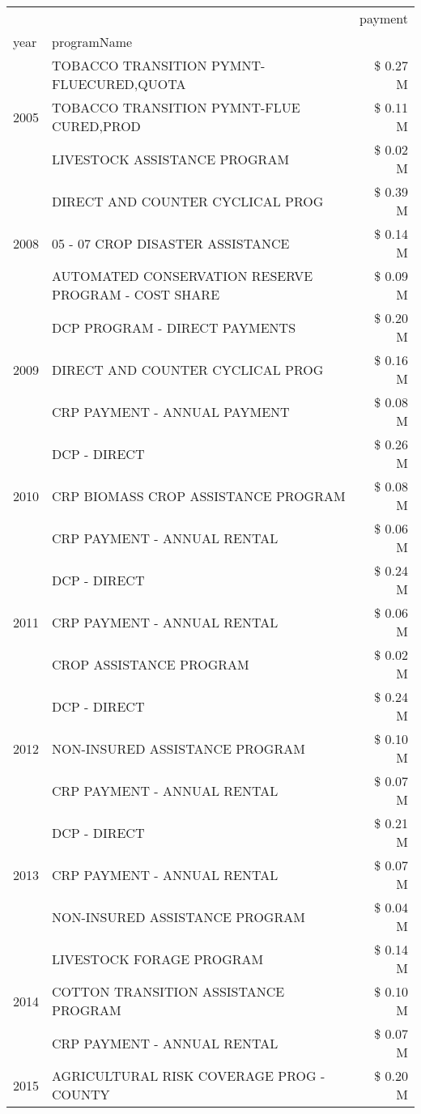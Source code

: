 \begin{tabular}{llr}
\toprule
 &  & payment \\
year & programName &  \\
\midrule
\multirow[t]{3}{*}{2005} & TOBACCO TRANSITION PYMNT-FLUECURED,QUOTA & \$ 0.27 M \\
 & TOBACCO TRANSITION PYMNT-FLUE CURED,PROD & \$ 0.11 M \\
 & LIVESTOCK ASSISTANCE PROGRAM & \$ 0.02 M \\
\cline{1-3}
\multirow[t]{3}{*}{2008} & DIRECT AND COUNTER CYCLICAL PROG & \$ 0.39 M \\
 & 05 - 07 CROP DISASTER ASSISTANCE & \$ 0.14 M \\
 & AUTOMATED CONSERVATION RESERVE PROGRAM - COST SHARE & \$ 0.09 M \\
\cline{1-3}
\multirow[t]{3}{*}{2009} & DCP PROGRAM - DIRECT PAYMENTS & \$ 0.20 M \\
 & DIRECT AND COUNTER CYCLICAL PROG & \$ 0.16 M \\
 & CRP PAYMENT - ANNUAL PAYMENT & \$ 0.08 M \\
\cline{1-3}
\multirow[t]{3}{*}{2010} & DCP - DIRECT & \$ 0.26 M \\
 & CRP BIOMASS CROP ASSISTANCE PROGRAM & \$ 0.08 M \\
 & CRP PAYMENT - ANNUAL RENTAL & \$ 0.06 M \\
\cline{1-3}
\multirow[t]{3}{*}{2011} & DCP - DIRECT & \$ 0.24 M \\
 & CRP PAYMENT - ANNUAL RENTAL & \$ 0.06 M \\
 & CROP ASSISTANCE PROGRAM & \$ 0.02 M \\
\cline{1-3}
\multirow[t]{3}{*}{2012} & DCP - DIRECT & \$ 0.24 M \\
 & NON-INSURED ASSISTANCE PROGRAM & \$ 0.10 M \\
 & CRP PAYMENT - ANNUAL RENTAL & \$ 0.07 M \\
\cline{1-3}
\multirow[t]{3}{*}{2013} & DCP - DIRECT & \$ 0.21 M \\
 & CRP PAYMENT - ANNUAL RENTAL & \$ 0.07 M \\
 & NON-INSURED ASSISTANCE PROGRAM & \$ 0.04 M \\
\cline{1-3}
\multirow[t]{3}{*}{2014} & LIVESTOCK FORAGE PROGRAM & \$ 0.14 M \\
 & COTTON TRANSITION ASSISTANCE PROGRAM & \$ 0.10 M \\
 & CRP PAYMENT - ANNUAL RENTAL & \$ 0.07 M \\
\cline{1-3}
\multirow[t]{3}{*}{2015} & AGRICULTURAL RISK COVERAGE PROG - COUNTY & \$ 0.20 M \\

\end{tabular}
